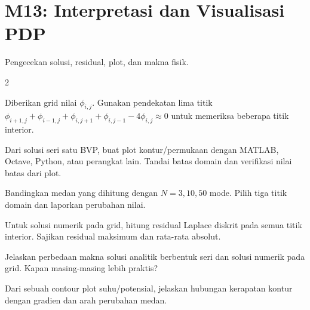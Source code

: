 \documentclass[10pt,a4paper]{article}
\newcommand{\level}[1]{\colorbox{levelbg}{\scriptsize\strut #1}}
\newcommand{\src}[1]{\colorbox{sourcebg}{\scriptsize\strut #1}}
\begin{document}
\section*{M13: Interpretasi dan Visualisasi PDP}
{\color{iteraGray}\small Pengecekan solusi, residual, plot, dan makna fisik.}\par\vspace{1mm}
\begin{multicols}{2}
\begin{qbox}[title={M13.1: Cek Laplace diskrit\hfill \level{L3}\;\src{PR}}]
\small Diberikan grid nilai $\phi_{i,j}$. Gunakan pendekatan lima titik $\phi_{i+1,j}+\phi_{i-1,j}+\phi_{i,j+1}+\phi_{i,j-1}-4\phi_{i,j}\approx0$ untuk memeriksa beberapa titik interior.
\end{qbox}
\begin{qbox}[title={M13.2: Plot kontur\hfill \level{L2}\;\src{PR}}]
\small Dari solusi seri satu BVP, buat plot kontur/permukaan dengan MATLAB, Octave, Python, atau perangkat lain. Tandai batas domain dan verifikasi nilai batas dari plot.
\end{qbox}
\begin{qbox}[title={M13.3: Konvergensi jumlah mode\hfill \level{L3}\;\src{Var}}]
\small Bandingkan medan yang dihitung dengan $N=3,10,50$ mode. Pilih tiga titik domain dan laporkan perubahan nilai.
\end{qbox}
\begin{qbox}[title={M13.4: Residual PDE\hfill \level{L4}\;\src{Var}}]
\small Untuk solusi numerik pada grid, hitung residual Laplace diskrit pada semua titik interior. Sajikan residual maksimum dan rata-rata absolut.
\end{qbox}
\begin{qbox}[title={M13.5: Analitik vs numerik\hfill \level{L2}\;\src{Var}}]
\small Jelaskan perbedaan makna solusi analitik berbentuk seri dan solusi numerik pada grid. Kapan masing-masing lebih praktis?
\end{qbox}
\begin{qbox}[title={M13.6: Interpretasi medan\hfill \level{L2}\;\src{Var}}]
\small Dari sebuah contour plot suhu/potensial, jelaskan hubungan kerapatan kontur dengan gradien dan arah perubahan medan.
\end{qbox}
\end{multicols}
\newpage
\end{document}
